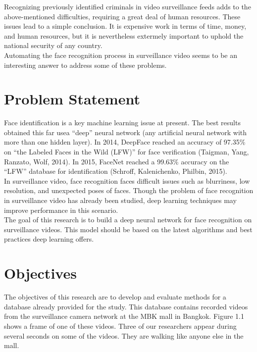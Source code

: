 Recognizing previously identified criminals in video surveillance feeds adds to the above-mentioned difficulties, requiring a great deal of human resources. These issues lead to a simple conclusion.  It is expensive work in terms of time, money, and human resources, but it is nevertheless extermely important to uphold the national security of any country.\\

Automating the face recognition process in surveillance video seems to be an interesting answer to address some of these problems.\\


\section{Problem Statement}

 Face identification is a key machine learning issue at present. The best results obtained this far usea \enquote{deep} neural network (any artificial neural network with more than one hidden layer). In 2014, DeepFace reached an accuracy of 97.35\% on \enquote{the Labeled Faces in the Wild (LFW)} for face verification (Taigman, Yang, Ranzato, Wolf, 2014). In 2015, FaceNet reached a 99.63\% accuracy on the \enquote{LFW} database for identification (Schroff, Kalenichenko, Philbin, 2015).\\


In surveillance video, face recognition faces difficult issues such as blurriness, low resolution, and unexpected poses of faces. Though the problem of face recognition in surveillance video has already been studied, deep learning techniques may improve performance in this scenario.\\

The goal of this research is to build a deep neural network for face recognition on surveillance videos. This model should be based on the latest algorithms and best practices deep learning offers.

\section{Objectives}

The objectives of this research are to develop and evaluate methods for a database already provided for the study. This database contains recorded videos from the surveillance camera network at the MBK mall in Bangkok. Figure 1.1 shows a frame of one of these videos. Three of our researchers appear during several seconds on some of the videos. They are walking like anyone else in the mall.\\

